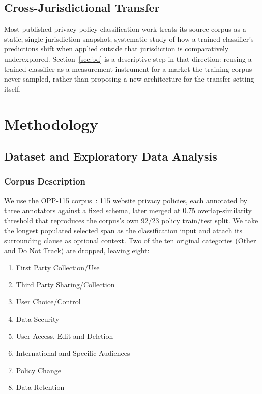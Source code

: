 \documentclass[11pt]{article}
\begin{document}
\subsection{Cross-Jurisdictional Transfer}

Most published privacy-policy classification work treats its source corpus as a static, single-jurisdiction snapshot; systematic study of how a trained classifier's predictions shift when applied outside that jurisdiction is comparatively underexplored. Section~\ref{sec:bd} is a descriptive step in that direction: reusing a trained classifier as a measurement instrument for a market the training corpus never sampled, rather than proposing a new architecture for the transfer setting itself.

\section{Methodology}
\label{sec:methodology}

\subsection{Dataset and Exploratory Data Analysis}

\subsubsection{Corpus Description}

We use the OPP-115 corpus~\cite{wilson-etal-2016-creation}: 115 website privacy policies, each annotated by three annotators against a fixed schema, later merged at 0.75 overlap-similarity threshold that reproduces the corpus's own 92/23 policy train/test split. We take the longest populated selected span as the classification input and attach its surrounding clause as optional context. Two of the ten original categories (Other and Do Not Track) are dropped, leaving eight:
\begin{enumerate}
\item First Party Collection/Use
\item Third Party Sharing/Collection
\item User Choice/Control
\item Data Security
\item User Access, Edit and Deletion
\item International and Specific Audiences
\item Policy Change
\item Data Retention
\end{enumerate}
\end{document}
